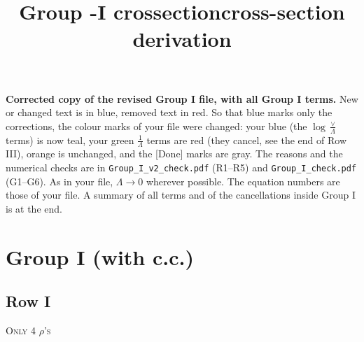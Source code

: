 \documentclass[9pt]{article}
\title{Group -I {\color{red}crossection}{\color{blue}cross-section} derivation}
\author{}
\date{}
\numberwithin{equation}{section}
\begin{document}
\maketitle
\begingroup\color{blue}\noindent\textbf{Corrected copy of the revised Group I file, with all Group I terms.} New or changed text is in blue, removed text in red. So that blue marks only the corrections, the colour marks of your file were changed: your blue (the $\log\frac{\vee}{\Lambda}$ terms) is now teal, your green $\frac{1}{\Lambda}$ terms are red (they cancel, see the end of Row III), orange is unchanged, and the [Done] marks are gray. The reasons and the numerical checks are in \texttt{Group\_I\_v2\_check.pdf} (R1--R5) and \texttt{Group\_I\_check.pdf} (G1--G6). As in your file, $\Lambda\to0$ wherever possible. The equation numbers are those of your file. A summary of all terms and of the cancellations inside Group I is at the end.\par\endgroup
\section{Group I (with c.c.)}
\subsection{Row I\,}
\textsc{Only 4 $\rho$'s}
\end{document}
